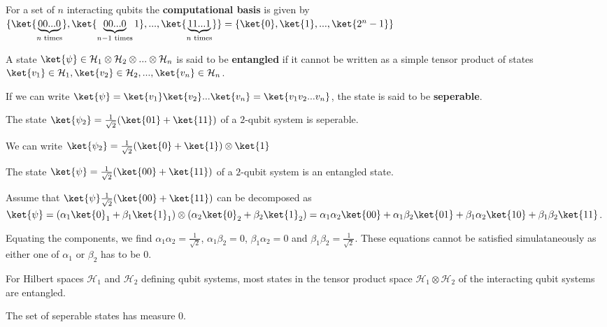 \begin{defn}

    For a set of $n$ interacting qubits the \textbf{computational basis} is given by $\{ \ket{\underbrace{00...0}_{n \text{ times}}}, \ket{\underbrace{00...0}_{n-1 \text{ times}}1}, ... ,\ket{\underbrace{11...1}_{n \text{ times}}} \} = \{ \ket{0}, \ket{1}, ... , \ket{2^n - 1} \}$
\end{defn}




\begin{defn}
    A state $\ket{\psi} \in \mathcal{H}_1 \otimes \mathcal{H}_2 \otimes ... \otimes \mathcal{H}_n$ is said to be \textbf{entangled} if it cannot be written as a simple tensor product of states $\ket{v_1} \in \mathcal{H}_1, \ket{v_2} \in \mathcal{H}_2, ..., \ket{v_n} \in \mathcal{H}_n$. 

    If we can write $\ket{\psi} = \ket{v_1}\ket{v_2}...\ket{v_n} = \ket{v_1 v_2...v_n}$, the state is said to be \textbf{seperable}.
\end{defn}

\begin{eg}
The state $\ket{\psi_2} = \frac{1}{\sqrt{2}} (\ket{01} + \ket{11})$ of a $2$-qubit system is seperable. 

We can write $\ket{\psi_2} = \frac{1}{\sqrt{2}} (\ket{0} + \ket{1}) \otimes \ket{1}$
\end{eg}


\begin{eg}
The state $\ket{\psi} = \frac{1}{\sqrt{2}} (\ket{00} + \ket{11})$ of a $2$-qubit system is an entangled state.

    Assume that  $\ket{\psi} \frac{1}{\sqrt{2}} (\ket{00} + \ket{11}) $ can be decomposed as $\ket{\psi} = (\alpha_1 \ket{0}_1 + \beta_1 \ket{1}_1) \otimes (\alpha_2 \ket{0}_2 + \beta_2 \ket{1}_2) = \alpha_1 \alpha_2 \ket{00} + \alpha_1 \beta_2 \ket{01} + \beta_1 \alpha_2 \ket{10} + \beta_1 \beta_2 \ket{11}$.

    Equating the components, we find $\alpha_1 \alpha_2 = \displaystyle\frac{1}{\sqrt{2}}$, $\alpha_1 \beta_2 = 0$, $\beta_1 \alpha_2 = 0$ and $\beta_1 \beta_2 = \displaystyle\frac{1}{\sqrt{2}}$. These equations cannot be satisfied simulataneously as either one of $\alpha_1$ or $\beta_2$ has to be $0$.
\end{eg}


For Hilbert spaces $\mathcal{H}_1$ and $\mathcal{H}_2$ defining qubit systems, most states in the tensor product space $\mathcal{H}_1 \otimes \mathcal{H}_2$ of the interacting qubit systems are entangled.
\begin{prop}
    The set of seperable states has measure 0.
\end{prop}

